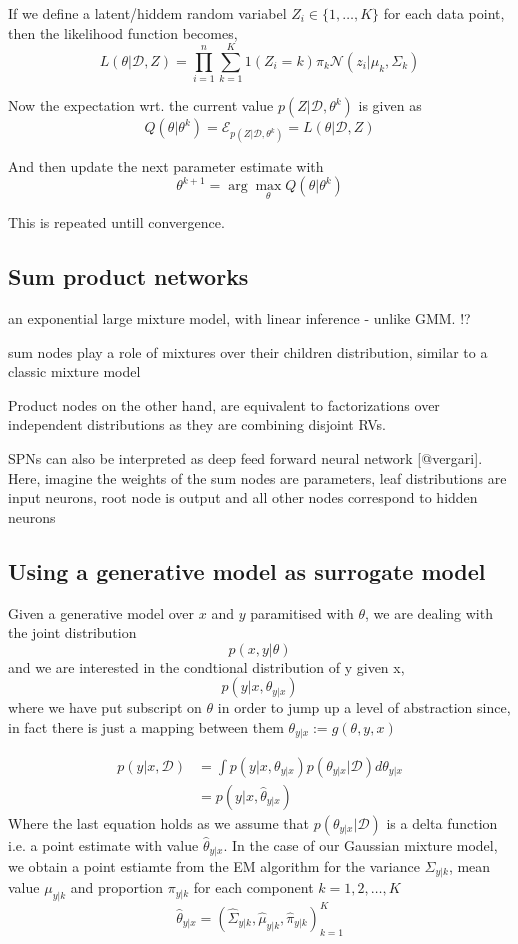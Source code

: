 If we define a latent/hiddem random variabel $Z_i \in \{1,\dots, K\}$ for each data point, then 
the likelihood function becomes, 
$$L(\theta|\mathcal{D}, Z) = \prod_{i=1}^n \sum_{k=1}^K 1(Z_i = k) \pi_k \mathcal{N}(z_i|\mu_k, \Sigma_k)$$

Now the expectation wrt. the current value $p(Z|\mathcal{D}, \theta^k)$ is given as 
$$Q(\theta|\theta^k) = \mathcal{E}_{p(Z|\mathcal{D}, \theta^k)}=L(\theta|\mathcal{D}, Z) $$

And then update the next parameter estimate with
$$\theta^{k+1} = \arg \max_{\theta} Q(\theta|\theta^k)$$

This is repeated untill convergence. 


\subsection{Sum product networks}
an exponential large mixture model, with linear inference - unlike GMM. !?

sum nodes play a role of
mixtures over their children distribution, similar to a classic mixture model

Product
nodes on the other hand, are equivalent to factorizations over independent distributions as they are
combining disjoint RVs.

SPNs can also be interpreted as deep feed forward neural network [@vergari]. Here, imagine the
weights of the sum nodes are parameters, leaf distributions are input neurons, root node is output and
all other nodes correspond to hidden neurons


\subsection{Using a generative model as surrogate model}
Given a generative model over $x$ and $y$ paramitised with $\theta$, we are dealing with the joint distribution
$$p(x,y|\theta)$$
and we are interested in the condtional distribution of y given x, 
$$p(y|x, \theta_{y|x})$$
where we have put subscript on $\theta$ in order to jump up a level of abstraction since, 
in fact there is just a mapping between them $\theta_{y|x} := g(\theta, y, x)$ 




\begin{align*}
    p(y|x, \mathcal{D}) &= \int p(y|x,\theta_{y|x})p(\theta_{y|x}|\mathcal{D}) d\theta_{y|x}  \\
    &=  p(y|x,\hat \theta_{y|x})
\end{align*}
Where the last equation holds as we assume that $p(\theta_{y|x}|\mathcal{D})$ is a delta function
i.e. a point estimate with value $\hat \theta_{y|x}$. In the case of our Gaussian mixture model, 
we obtain a point estiamte from the EM algorithm for the variance $\Sigma_{y|k}$, mean value $\mu_{y|k}$ and proportion $\pi_{y|k}$
for each component $k = 1,2, \dots, K$
$$\hat \theta_{y|x} = (\hat\Sigma_{y|k}, \hat\mu_{y|k}, \hat\pi_{y|k})_{k=1}^K$$

